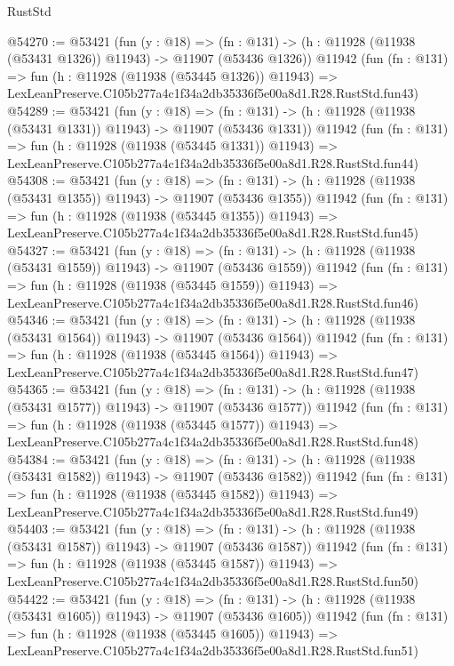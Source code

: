 \begin{lexlean}{RustStd}
\begin{coremodule}
@54270 := @53421
    (fun (y : @18) =>
    (fn : @131) -> (h : @11928 (@11938 (@53431 @1326)) @11943) -> @11907 (@53436 @1326))
    @11942
    (fun (fn : @131) =>
    fun (h : @11928 (@11938 (@53445 @1326)) @11943) =>
    LexLeanPreserve.C105b277a4c1f34a2db35336f5e00a8d1.R28.RustStd.fun43)
@54289 := @53421
    (fun (y : @18) =>
    (fn : @131) -> (h : @11928 (@11938 (@53431 @1331)) @11943) -> @11907 (@53436 @1331))
    @11942
    (fun (fn : @131) =>
    fun (h : @11928 (@11938 (@53445 @1331)) @11943) =>
    LexLeanPreserve.C105b277a4c1f34a2db35336f5e00a8d1.R28.RustStd.fun44)
@54308 := @53421
    (fun (y : @18) =>
    (fn : @131) -> (h : @11928 (@11938 (@53431 @1355)) @11943) -> @11907 (@53436 @1355))
    @11942
    (fun (fn : @131) =>
    fun (h : @11928 (@11938 (@53445 @1355)) @11943) =>
    LexLeanPreserve.C105b277a4c1f34a2db35336f5e00a8d1.R28.RustStd.fun45)
@54327 := @53421
    (fun (y : @18) =>
    (fn : @131) -> (h : @11928 (@11938 (@53431 @1559)) @11943) -> @11907 (@53436 @1559))
    @11942
    (fun (fn : @131) =>
    fun (h : @11928 (@11938 (@53445 @1559)) @11943) =>
    LexLeanPreserve.C105b277a4c1f34a2db35336f5e00a8d1.R28.RustStd.fun46)
@54346 := @53421
    (fun (y : @18) =>
    (fn : @131) -> (h : @11928 (@11938 (@53431 @1564)) @11943) -> @11907 (@53436 @1564))
    @11942
    (fun (fn : @131) =>
    fun (h : @11928 (@11938 (@53445 @1564)) @11943) =>
    LexLeanPreserve.C105b277a4c1f34a2db35336f5e00a8d1.R28.RustStd.fun47)
@54365 := @53421
    (fun (y : @18) =>
    (fn : @131) -> (h : @11928 (@11938 (@53431 @1577)) @11943) -> @11907 (@53436 @1577))
    @11942
    (fun (fn : @131) =>
    fun (h : @11928 (@11938 (@53445 @1577)) @11943) =>
    LexLeanPreserve.C105b277a4c1f34a2db35336f5e00a8d1.R28.RustStd.fun48)
@54384 := @53421
    (fun (y : @18) =>
    (fn : @131) -> (h : @11928 (@11938 (@53431 @1582)) @11943) -> @11907 (@53436 @1582))
    @11942
    (fun (fn : @131) =>
    fun (h : @11928 (@11938 (@53445 @1582)) @11943) =>
    LexLeanPreserve.C105b277a4c1f34a2db35336f5e00a8d1.R28.RustStd.fun49)
@54403 := @53421
    (fun (y : @18) =>
    (fn : @131) -> (h : @11928 (@11938 (@53431 @1587)) @11943) -> @11907 (@53436 @1587))
    @11942
    (fun (fn : @131) =>
    fun (h : @11928 (@11938 (@53445 @1587)) @11943) =>
    LexLeanPreserve.C105b277a4c1f34a2db35336f5e00a8d1.R28.RustStd.fun50)
@54422 := @53421
    (fun (y : @18) =>
    (fn : @131) -> (h : @11928 (@11938 (@53431 @1605)) @11943) -> @11907 (@53436 @1605))
    @11942
    (fun (fn : @131) =>
    fun (h : @11928 (@11938 (@53445 @1605)) @11943) =>
    LexLeanPreserve.C105b277a4c1f34a2db35336f5e00a8d1.R28.RustStd.fun51)

\end{coremodule}
\end{lexlean}

